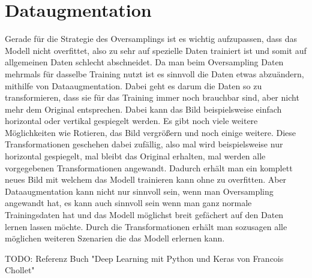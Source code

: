 \documentclass[11pt, a4paper]{article}
\begin{document}
\section{Dataugmentation}
Gerade für die Strategie des Oversamplings ist es wichtig aufzupassen, dass das Modell nicht overfittet, also zu sehr auf spezielle Daten trainiert ist und somit auf allgemeinen Daten schlecht abschneidet. Da man beim Oversampling Daten mehrmals für dasselbe Training nutzt ist es sinnvoll die Daten etwas abzuändern, mithilfe von Dataaugmentation. Dabei geht es darum die Daten so zu transformieren, dass sie für das Training immer noch brauchbar sind, aber nicht mehr dem Original entsprechen. Dabei kann das Bild beispielsweise einfach horizontal oder vertikal gespiegelt werden. Es gibt noch viele weitere Möglichkeiten wie Rotieren, das Bild vergrößern und noch einige weitere. Diese Transformationen geschehen dabei zufällig, also mal wird beispielsweise nur horizontal gespiegelt, mal bleibt das Original erhalten, mal werden alle vorgegebenen Transformationen angewandt. Dadurch erhält man ein komplett neues Bild mit welchem das Modell trainieren kann ohne zu overfitten. Aber Dataaugmentation kann nicht nur sinnvoll sein, wenn man Oversampling angewandt hat, es kann auch sinnvoll sein wenn man ganz normale Trainingsdaten hat und das Modell möglichst breit gefächert auf den Daten lernen lassen möchte. Durch die Transformationen erhält man sozusagen alle möglichen weiteren Szenarien die das Modell erlernen kann.

TODO: Referenz Buch "Deep Learning mit Python und Keras von Francois Chollet"
\end{document}
